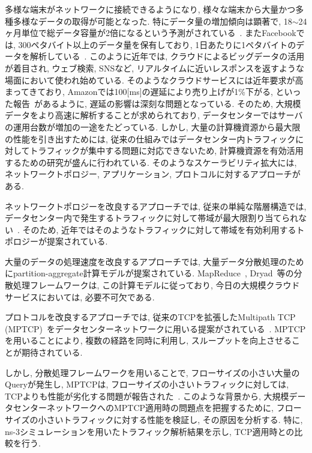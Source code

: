 \documentclass[10pt, a4paper, twocolumn]{jsarticle}
\begin{document}
多様な端末がネットワークに接続できるようになり, 様々な端末から大量かつ多種多様なデータの取得が可能となった.
特にデータ量の増加傾向は顕著で, 18$\sim$24ヶ月単位で総データ容量が2倍になるという予測がされている~\cite{IBM_rep}.
またFacebookでは, 300ペタバイト以上のデータ量を保有しており, 1日あたりに1ペタバイトのデータを解析している~\cite{presto}.
このように近年では, クラウドによるビッグデータの活用が着目され, ウェブ検索, SNSなど,
リアルタイムに近いレスポンスを返すような場面において使われ始めている.
そのようなクラウドサービスには近年要求が高まってきており, Amazonでは100[ms]の遅延により売り上げが1\%下がる,
といった報告~\cite{amazon}があるように, 遅延の影響は深刻な問題となっている.
そのため, 大規模データをより高速に解析することが求められており, データセンターではサーバの運用台数が増加の一途をたどっている.
しかし, 大量の計算機資源から最大限の性能を引き出すためには,
従来の仕組みではデータセンター内トラフィックに対してトラフィックが集中する問題に対応できないため, 計算機資源を有効活用するための研究が盛んに行われている.
そのようなスケーラビリティ拡大には, ネットワークトポロジー, アプリケーション, プロトコルに対するアプローチがある.

ネットワークトポロジーを改良するアプローチでは, 従来の単純な階層構造では,
データセンター内で発生するトラフィックに対して帯域が最大限割り当てられない~\cite{fattree}.
そのため, 近年ではそのようなトラフィックに対して帯域を有効利用するトポロジーが提案されている.

大量のデータの処理速度を改良するアプローチでは,
大量データ分散処理のためにpartition-aggregate計算モデルが提案されている.
MapReduce~\cite{mapreduce}, Dryad~\cite{dryad}等の分散処理フレームワークは,
この計算モデルに従っており, 今日の大規模クラウドサービスにおいては, 必要不可欠である.

プロトコルを改良するアプローチでは,
従来のTCPを拡張したMultipath TCP
(MPTCP)~\cite{mptcp}をデータセンターネットワークに用いる提案がされている~\cite{fattree,bcube,vl2}.
MPTCPを用いることにより, 複数の経路を同時に利用し, スループットを向上させることが期待されている.

しかし, 分散処理フレームワークを用いることで, フローサイズの小さい大量のQueryが発生し, MPTCPは,
フローサイズの小さいトラフィックに対しては, TCPよりも性能が劣化する問題が報告された~\cite{improving}.
このような背景から, 大規模データセンターネットワークへのMPTCP適用時の問題点を把握するために,
フローサイズの小さいトラフィックに対する性能を検証し,
その原因を分析する.
特に, ns-3シミュレーションを用いたトラフィック解析結果を示し, TCP適用時との比較を行う.
\end{document}
